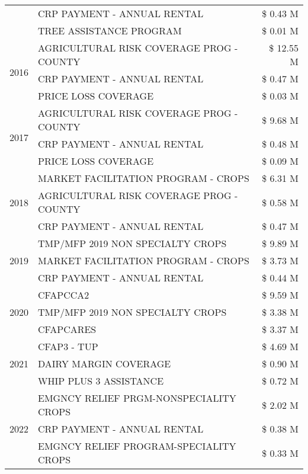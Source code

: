 \begin{tabular}{llr}
 & CRP PAYMENT - ANNUAL RENTAL & \$ 0.43 M \\
 & TREE ASSISTANCE PROGRAM & \$ 0.01 M \\
\cline{1-3}
\multirow[t]{3}{*}{2016} & AGRICULTURAL RISK COVERAGE PROG - COUNTY & \$ 12.55 M \\
 & CRP PAYMENT - ANNUAL RENTAL & \$ 0.47 M \\
 & PRICE LOSS COVERAGE & \$ 0.03 M \\
\cline{1-3}
\multirow[t]{3}{*}{2017} & AGRICULTURAL RISK COVERAGE PROG - COUNTY & \$ 9.68 M \\
 & CRP PAYMENT - ANNUAL RENTAL & \$ 0.48 M \\
 & PRICE LOSS COVERAGE & \$ 0.09 M \\
\cline{1-3}
\multirow[t]{3}{*}{2018} & MARKET FACILITATION PROGRAM - CROPS & \$ 6.31 M \\
 & AGRICULTURAL RISK COVERAGE PROG - COUNTY & \$ 0.58 M \\
 & CRP PAYMENT - ANNUAL RENTAL & \$ 0.47 M \\
\cline{1-3}
\multirow[t]{3}{*}{2019} & TMP/MFP 2019 NON SPECIALTY CROPS & \$ 9.89 M \\
 & MARKET FACILITATION PROGRAM - CROPS & \$ 3.73 M \\
 & CRP PAYMENT - ANNUAL RENTAL & \$ 0.44 M \\
\cline{1-3}
\multirow[t]{3}{*}{2020} & CFAPCCA2 & \$ 9.59 M \\
 & TMP/MFP 2019 NON SPECIALTY CROPS & \$ 3.38 M \\
 & CFAPCARES & \$ 3.37 M \\
\cline{1-3}
\multirow[t]{3}{*}{2021} & CFAP3 - TUP & \$ 4.69 M \\
 & DAIRY MARGIN COVERAGE & \$ 0.90 M \\
 & WHIP PLUS 3 ASSISTANCE & \$ 0.72 M \\
\cline{1-3}
\multirow[t]{3}{*}{2022} & EMGNCY RELIEF PRGM-NONSPECIALITY CROPS & \$ 2.02 M \\
 & CRP PAYMENT - ANNUAL RENTAL & \$ 0.38 M \\
 & EMGNCY RELIEF PROGRAM-SPECIALITY CROPS & \$ 0.33 M \\
\cline{1-3}
\bottomrule
\end{tabular}
